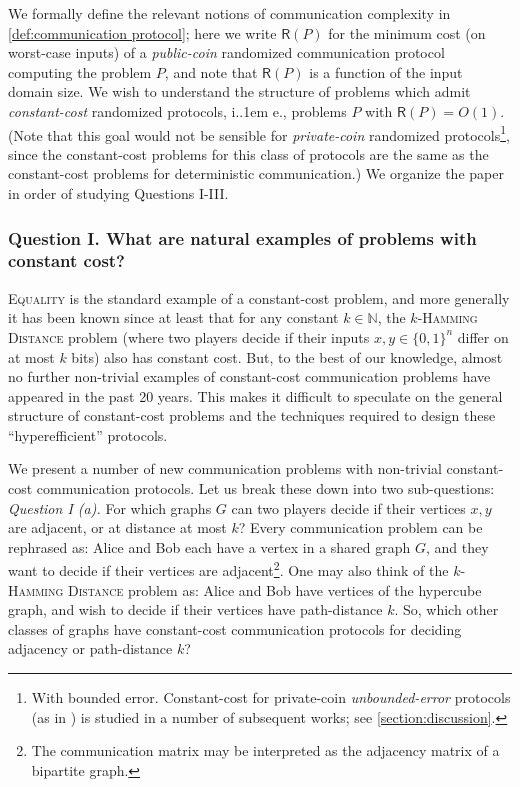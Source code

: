 \documentclass{article}
\makeatletter
\newcommand{\zo}{\{0,1\}}
\newcommand{\bN}{\ensuremath{\mathbb{N}}}
\newcommand*\ie{i.\kern.1em e.\@\xspace} %
\makeatother
\begin{document}
\newcommand{\R}{\mathsf{R}}
We formally define the relevant notions of communication complexity in \cref{def:communication
protocol}; here we write $\R(P)$ for the minimum cost (on worst-case inputs) of a \emph{public-coin}
randomized communication protocol computing the problem $P$, and note that $\R(P)$ is a function of
the input domain size.  We wish to understand the structure of problems which admit
\emph{constant-cost} randomized protocols, \ie, problems $P$ with $\R(P) = O(1)$. (Note that this
goal would not be sensible for \emph{private-coin} randomized protocols\footnote{With bounded error.
Constant-cost for private-coin \emph{unbounded-error} protocols (as in \cite{PS86}) is studied in a
number of subsequent works; see \cref{section:discussion}.}, since the constant-cost problems for this
class of protocols are the same as the constant-cost problems for deterministic communication.) We
organize the paper in order of studying Questions I-III.

\subsubsection*{Question I. What are natural examples of problems with constant cost?}

\textsc{Equality} is the
standard example of a constant-cost problem, and more generally it has been known since at least
\cite{Yao03} that for any constant $k \in \bN$, the \textsc{$k$-Hamming Distance} problem (where two players
decide if their inputs $x,y \in \zo^n$ differ on at most $k$ bits) also has constant cost. But, to
the best of our knowledge, almost no further non-trivial examples of constant-cost communication problems
have appeared in the past 20 years. This makes it difficult to speculate on the general structure of
constant-cost problems and the techniques required to design these ``hyperefficient'' protocols.

We present a number of new communication problems with non-trivial constant-cost communication
protocols. Let us break these down into two sub-questions:\\

\noindent
\emph{Question I (a).} For which graphs $G$ can two players decide if their vertices $x,y$ are
adjacent, or at distance at most $k$? Every communication problem can be rephrased as: Alice and Bob
each have a vertex in a shared graph $G$, and they want to decide if their vertices are
adjacent\footnote{The communication matrix may be interpreted as the adjacency matrix of a bipartite
graph.}. One may also think of the \textsc{$k$-Hamming Distance} problem as: Alice and Bob have
vertices of the hypercube graph, and wish to decide if their vertices have path-distance $k$. So,
which other classes of graphs have constant-cost communication protocols for deciding
adjacency or path-distance $k$?
\end{document}
